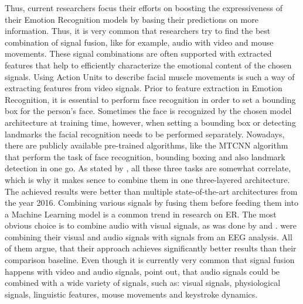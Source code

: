 \newline\newline
Thus, current researchers focus their efforts on boosting the expressiveness of their Emotion Recognition models by basing their predictions on more information. Thus, it is very common that researchers try to find the best combination of signal fusion, like for example, audio with video and mouse movements. These signal combinations are often supported with extracted features that help to efficiently characterize the emotional content of the chosen signals.
\newline\newline
Using Action Units to describe facial muscle movements is such a way of extracting features from video signals. Prior to feature extraction in Emotion Recognition, it is essential to perform face recognition in order to set a bounding box for the person's face. Sometimes the face is recognized by the chosen model architecture at training time, however, when setting a bounding box or detecting landmarks the facial recognition needs to be performed separately. Nowadays, there are publicly available pre-trained algorithms, like the MTCNN algorithm \citep{Zhang:2016:MTCCN} that perform the task of face recognition, bounding boxing and also landmark detection in one go. As stated by \citet{Zhang:2016:MTCCN}, all these three tasks are somewhat correlate, which is why it makes sence to combine them in one three-layered architecture. The achieved results were better than multiple state-of-the-art architectures from the year 2016.
\newline\newline
Combining various signals by fusing them before feeding them into a Machine Learning model is a common trend in research on \gls{ER}. The most obvious choice is to combine audio with visual signals, as was done by \citet{Yan:2016:MultiClueFusion} and \citet{Hossain:2019:AudioVisualER}. \citet{Xing:2019:EEGAudioVisual} were combining their visual and audio signals with signals from an EEG analysis. All of them argue, that their approach achieves significantly better results than their comparison baseline.\newline
Even though it is currently very common that signal fusion happens with video and audio signals, \citet{Akcay:2020:SpeechEmotionRecognition(SER)} point out, that audio signals could be combined with a wide variety of signals, such as: visual signals, physiological signals, linguistic features, mouse movements and keystroke dynamics.


